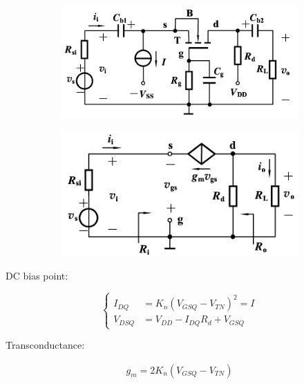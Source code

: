 \begin{figure}[H]
  \centering
  \begin{subfigure}{.5\textwidth}
    \centering
    \includegraphics[width=\linewidth]{figures/MOSFET-Common-G}
  \end{subfigure}
  \begin{subfigure}{.45\textwidth}
    \centering
    \includegraphics[width=\linewidth]{figures/MOSFET-Common-Gs}
  \end{subfigure}
\end{figure}

DC bias point:

\begin{equation*}
  \left\{
  \begin{aligned}
    I_{DQ} &= K_n \left( V_{GSQ} - V_{TN} \right)^2 = I \\
    V_{DSQ} &= V_{DD} - I_{DQ} R_d + V_{GSQ}
  \end{aligned}
  \right.
\end{equation*}

Transconductance:

\begin{equation*}
  \begin{aligned}
    g_m = 2 K_n \left( V_{GSQ} - V_{TN} \right)
  \end{aligned}
\end{equation*}

